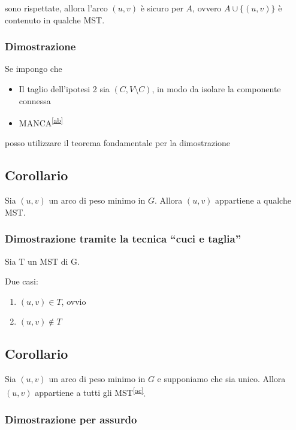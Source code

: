 \documentclass[11pt,a4paper,twoside,openright]{book}
\providecommand{\tightlist}{\setlength{\itemsep}{0pt}\setlength{\parskip}{0pt}}
\begin{document}
{{{sono rispettate, allora l'arco $(u,v)$ è sicuro per $A$, ovvero $A \cup \{(u,v)\}$ è contenuto in qualche MST.}

\subsubsection{Dimostrazione}

{Se impongo che}

\begin{itemize}
\tightlist
\item
  {Il taglio dell'ipotesi 2 sia $(C,V\setminus C)$, in modo da isolare la componente connessa}
\item
  {MANCA}\textsuperscript{\protect\hyperlink{cmnt28}{{[}ab{]}}}
\end{itemize}

{posso utilizzare il teorema fondamentale per la dimostrazione}

\subsection{Corollario}

{Sia $(u,v)$ un arco di peso minimo in $G$. Allora $(u,v)$ appartiene a qualche MST.}

\subsubsection{Dimostrazione tramite la tecnica ``cuci e taglia''}

{Sia T un MST di G. }

{Due casi:}

\begin{enumerate}
\tightlist
\item
  $(u,v)\in T${, ovvio}
\item
  $(u,v)\notin T$
\end{enumerate}

\subsection{Corollario}

{Sia $(u,v)$ un arco di peso minimo in $G$ e supponiamo che sia unico. Allora $(u,v)$ appartiene a tutti gli MST}\textsuperscript{\protect\hyperlink{cmnt29}{{[}ac{]}}}{.}

\subsubsection{Dimostrazione per assurdo}

}}
\end{document}
